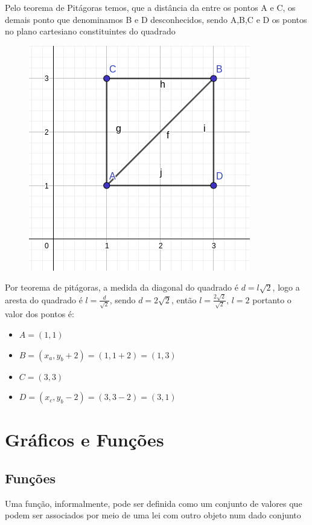 \begin{multicols*}{2}
    Pelo teorema de Pitágoras temos, que a distância da entre os pontos A e C, os demais ponto que denominamos B e D desconhecidos, sendo A,B,C e D  os pontos no plano cartesiano constituintes do quadrado

    \begin{figure}[H]
        \centering
        \includegraphics[scale=0.3]{assets/rafael/img30.png}
    \end{figure}

    Por teorema de pitágoras, a medida da diagonal do quadrado é $d = l\sqrt{2}$, logo a aresta do quadrado é $l = \frac{d}{\sqrt{2}}$, sendo $d = 2 \sqrt{2}$, então $l = \frac{2 \sqrt{2}}{\sqrt{2}}$, $ l = 2$
    portanto o valor dos pontos é:
    \begin{itemize}
        \item $A = (1,1)$
        \item $B = (x_a, y_b+2) = (1,1+2) = (1,3) $
        \item $C = (3,3)$
        \item $D = (x_c, y_b - 2) = (3, 3 - 2) = (3,1)$
    \end{itemize}

    \section*{ Gráficos e Funções}

    \subsection*{Funções}
    Uma função, informalmente, pode ser definida  como um conjunto de valores que podem ser 				associados por meio de uma lei com outro objeto num dado conjunto


\end{multicols*}
